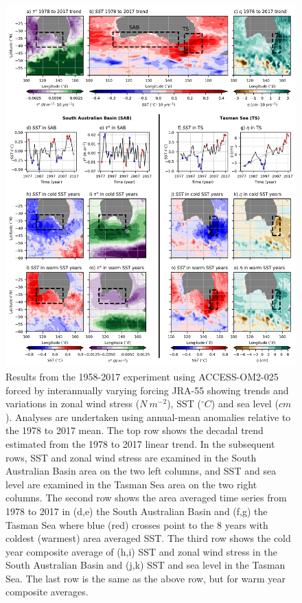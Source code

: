 \documentclass[draft,linenumbers]{agujournal2018}
\begin{document}
\begin{figure}[h]
\centering
\includegraphics[trim={0 0.25cm 0 0},clip, width=1\textwidth]{c08_fig2_.png}
\caption{Results from the 1958-2017 experiment using ACCESS-OM2-025 forced by interannually varying forcing JRA-55 showing trends and variations in zonal wind stress ($N\ m^{-2}$), SST ($^{\circ}C$) and sea level ($cm$). Analyses are undertaken using annual-mean anomalies relative to the 1978 to 2017 mean. The top row shows the decadal trend estimated from the 1978 to 2017 linear trend. In the subsequent rows, SST and zonal wind stress are examined in the South Australian Basin area on the two left columns, and SST and sea level are examined in the Tasman Sea area on the two right columns. The second row shows the area averaged time series from 1978 to 2017 in (d,e) the South Australian Basin and (f,g) the Tasman Sea where blue (red) crosses point to the 8 years with coldest (warmest) area averaged SST. The third row shows the cold year composite average of (h,i) SST and zonal wind stress in the South Australian Basin and (j,k) SST and sea level in the Tasman Sea. The last row is the same as the above row, but for warm year composite averages.}\label{c08_fig1_}
\end{figure}
\end{document}
